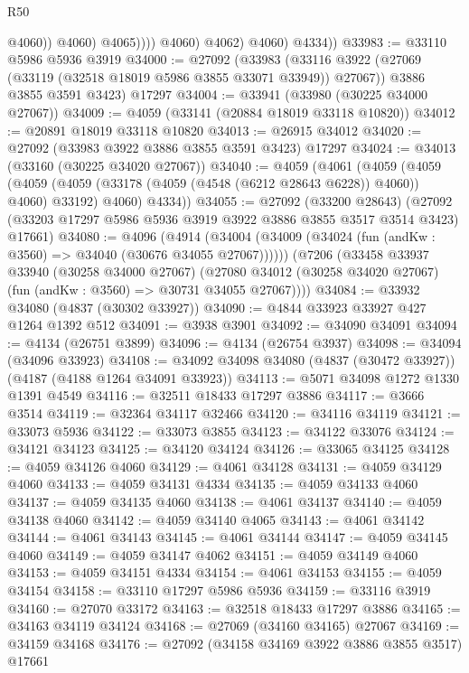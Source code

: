 \begin{lexlean}{R50}
\begin{coremodule}
                            @4060))
                        @4060)
                      @4065))))
              @4060)
            @4062)
          @4060)
        @4334))
@33983 := @33110 @5986 @5936 @3919
@34000 := @27092
    (@33983
      (@33116 @3922 (@27069 (@33119 (@32518 @18019 @5986 @3855 @33071 @33949)) @27067))
      @3886
      @3855
      @3591
      @3423)
    @17297
@34004 := @33941 (@33980 (@30225 @34000 @27067))
@34009 := @4059 (@33141 (@20884 @18019 @33118 @10820))
@34012 := @20891 @18019 @33118 @10820
@34013 := @26915 @34012
@34020 := @27092 (@33983 @3922 @3886 @3855 @3591 @3423) @17297
@34024 := @34013 (@33160 (@30225 @34020 @27067))
@34040 := @4059
    (@4061
      (@4059
        (@4059
          (@4059 (@4059 (@33178 (@4059 (@4548 (@6212 @28643 @6228)) @4060)) @4060) @33192)
          @4060)
        @4334))
@34055 := @27092
    (@33200 @28643)
    (@27092 (@33203 @17297 @5986 @5936 @3919 @3922 @3886 @3855 @3517 @3514 @3423) @17661)
@34080 := @4096
    (@4914 (@34004 (@34009 (@34024 (fun (andKw : @3560) => @34040 (@30676 @34055 @27067))))))
    (@7206
      (@33458
        @33937
        @33940
        (@30258 @34000 @27067)
        (@27080 @34012 (@30258 @34020 @27067) (fun (andKw : @3560) => @30731 @34055 @27067))))
@34084 := @33932 @34080 (@4837 (@30302 @33927))
@34090 := @4844 @33923 @33927 @427 @1264 @1392 @512
@34091 := @3938 @3901
@34092 := @34090 @34091
@34094 := @4134 (@26751 @3899)
@34096 := @4134 (@26754 @3937)
@34098 := @34094 (@34096 @33923)
@34108 := @34092 @34098 @34080 (@4837 (@30472 @33927)) (@4187 (@4188 @1264 @34091 @33923))
@34113 := @5071 @34098 @1272 @1330 @1391 @4549
@34116 := @32511 @18433 @17297 @3886
@34117 := @3666 @3514
@34119 := @32364 @34117 @32466
@34120 := @34116 @34119
@34121 := @33073 @5936
@34122 := @33073 @3855
@34123 := @34122 @33076
@34124 := @34121 @34123
@34125 := @34120 @34124
@34126 := @33065 @34125
@34128 := @4059 @34126 @4060
@34129 := @4061 @34128
@34131 := @4059 @34129 @4060
@34133 := @4059 @34131 @4334
@34135 := @4059 @34133 @4060
@34137 := @4059 @34135 @4060
@34138 := @4061 @34137
@34140 := @4059 @34138 @4060
@34142 := @4059 @34140 @4065
@34143 := @4061 @34142
@34144 := @4061 @34143
@34145 := @4061 @34144
@34147 := @4059 @34145 @4060
@34149 := @4059 @34147 @4062
@34151 := @4059 @34149 @4060
@34153 := @4059 @34151 @4334
@34154 := @4061 @34153
@34155 := @4059 @34154
@34158 := @33110 @17297 @5986 @5936
@34159 := @33116 @3919
@34160 := @27070 @33172
@34163 := @32518 @18433 @17297 @3886
@34165 := @34163 @34119 @34124
@34168 := @27069 (@34160 @34165) @27067
@34169 := @34159 @34168
@34176 := @27092 (@34158 @34169 @3922 @3886 @3855 @3517) @17661

\end{coremodule}
\end{lexlean}
